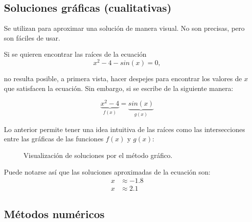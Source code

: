 \subsection{Soluciones gráficas (cualitativas)}

Se utilizan para aproximar una solución de manera visual. No son precisas, pero
son fáciles de usar.

\begin{eg}
    Si se quieren encontrar las raíces de la ecuación
    \begin{equation}\label{primer-problema}
        x^2 - 4 - sin(x) = 0,
    \end{equation}

    \noindent no resulta posible, a primera vista, hacer despejes para
    encontrar los valores de \(x\) que satisfacen la ecuación. Sin embargo, si
    se escribe de la siguiente manera:

    \[
        \underbrace{x^2 - 4}_{f(x)} = \underbrace{sin(x)}_{g(x)}
    \]

    Lo anterior permite tener una idea intuitiva de las raíces como las
    intersecciones entre las gráficas de las funciones \(f(x)\) y \(g(x)\):

    \begin{figure}[H]
        \centering
        \caption{Visualización de soluciones por el método gráfico.}
    \end{figure}

    Puede notarse así que las soluciones aproximadas de la ecuación son:
    \begin{align*}
        x & \approx -1.8 \\
        x & \approx 2.1
    \end{align*}

\end{eg}

\subsection{Métodos numéricos}

